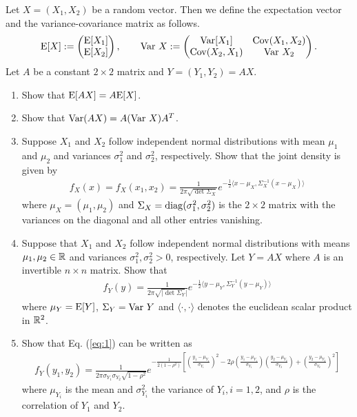 Let $X = (X_1, X_2)$ be a random vector. Then we define the expectation vector and the variance-covariance matrix as follows.
\begin{align*}
\mathrm{E}[X] := \begin{pmatrix}
\mathrm{E}[X_1] \\ \mathrm{E}[X_2]
\end{pmatrix}, \qquad \mathrm{Var}\ X := \begin{pmatrix}
\mathrm{Var}[X_1] & \mathrm{Cov}(X_1, X_2) \\
\mathrm{Cov}(X_2, X_1) & \mathrm{Var}\ X_2
\end{pmatrix}.
\end{align*}
Let $A$ be a constant $2\times 2$ matrix and $Y = (Y_1, Y_2) = AX$.
\begin{enumerate}
	\item Show that $\mathrm{E}[AX] = A\mathrm{E}[X]$.
	\item Show that $\U{Var}(AX) = A(\U{Var}\ X)A^T$.
	\item Suppose $X_1$ and $X_2$ follow independent normal distributions with mean $\mu_1$ and $\mu_2$ and variances $\sigma_1^2$ and $\sigma_2^2$, respectively. Show that the joint density is given by
	\begin{align*}
	f_X(x) = f_X(x_1, x_2) = \frac{1}{2\pi \sqrt{\det\Sigma_X}} e^{-\frac{1}{2}\langle x - \mu_X, \Sigma_X^{-1}(x - \mu_X) \rangle}
	\end{align*}
	where $\mu_X = (\mu_1, \mu_2)$ and $\Sigma_X = \mathrm{diag}(\sigma_1^2, \sigma_2^2)$ is the $2\times 2$ matrix with the variances on the diagonal and all other entries vanishing.
	\item  Suppose that $X_1$ and $X_2$ follow independent normal distributions with means $\mu_1, \mu_2\in \mathbb{R}$ and variances $\sigma_1^2, \sigma_2^2 > 0$, respectively. Let $Y = AX$ where $A$ is an invertible $n\times n$ matrix. Show that
	\begin{align}\label{eq:1}
	f_Y(y) = \frac{1}{2\pi\sqrt{|\det \Sigma_Y}|} e^{-\frac{1}{2}\langle y - \mu_Y, \Sigma_Y^{-1}(y-\mu_Y)\rangle}
	\end{align}
	where $\mu_Y = \mathrm{E}[Y]$, $\Sigma_Y = \mathrm{Var}\ Y$ and $\langle \cdot, \cdot\rangle$ denotes the euclidean scalar product in $\mathbb{R}^2$.
	\item Show that Eq. (\ref{eq:1}) can be written as
	\begin{align*}
	f_Y(y_1, y_2) = \frac{1}{2\pi \sigma_{Y_1}\sigma_{Y_2}\sqrt{1-\rho^2}} e^{-\frac{1}{2(1-\rho^2)}\left[\left(\frac{y_1 - \mu_{Y_1}}{\sigma_{Y_1}} \right)^2 - 2\rho\left(\frac{y_1-\mu_{Y_1}}{\sigma_{Y_1}} \right)\left(\frac{y_2 - \mu_{Y_2}}{\sigma_{Y_2}} \right) + \left(\frac{y_2 - \mu_{Y_2}}{\sigma_{Y_2}} \right)^2 \right]}
	\end{align*}
	where $\mu_{Y_i}$ is the mean and $\sigma_{Y_i}^2$ the variance of $Y_i, i = 1, 2$, and $\rho$ is the correlation of $Y_1$ and $Y_2$.
\end{enumerate}
